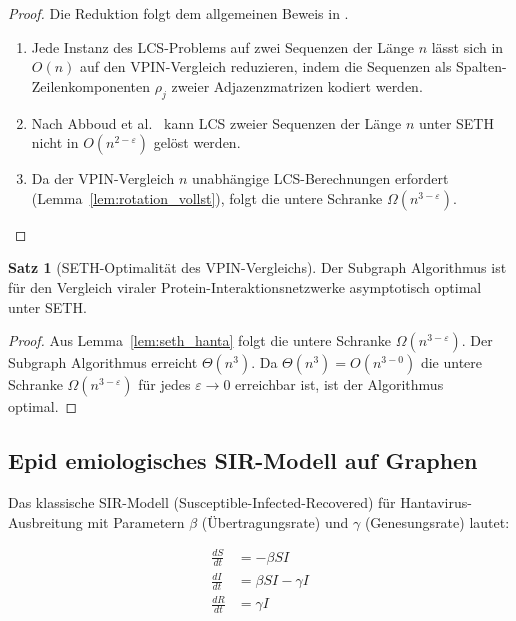 ﻿\documentclass[a4paper,12pt]{article}
\theoremstyle{definition}
\newtheorem{satz}{Satz}
\begin{document}
\begin{proof}
    Die Reduktion folgt dem allgemeinen Beweis in \cite{Epp2026}.
    \begin{enumerate}
        \item Jede Instanz des LCS-Problems auf zwei Sequenzen der L\"ange $n$
              l\"asst sich in $O(n)$ auf den VPIN-Vergleich reduzieren,
              indem die Sequenzen als Spalten-Zeilenkomponenten $\rho_j$
              zweier Adjazenzmatrizen kodiert werden.
        \item Nach Abboud et al.\ \cite{Abboud2015} kann LCS zweier Sequenzen
              der L\"ange $n$ unter SETH nicht in $O(n^{2-\varepsilon})$
              gel\"ost werden.
        \item Da der VPIN-Vergleich $n$ unabh\"angige LCS-Berechnungen erfordert
              (Lemma~\ref{lem:rotation_vollst}), folgt die untere Schranke
              $\Omega(n^{3-\varepsilon})$. \qedhere
    \end{enumerate}
\end{proof}

\begin{satz}[SETH-Optimalit\"at des VPIN-Vergleichs]
    Der Subgraph Algorithmus ist f\"ur den Vergleich viraler
    Protein-Interaktionsnetzwerke asymptotisch optimal unter SETH.
\end{satz}

\begin{proof}
    Aus Lemma~\ref{lem:seth_hanta} folgt die untere Schranke $\Omega(n^{3-\varepsilon})$.
    Der Subgraph Algorithmus erreicht $\Theta(n^3)$. Da $\Theta(n^3) = O(n^{3-0})$
    die untere Schranke $\Omega(n^{3-\varepsilon})$ f\"ur jedes $\varepsilon \to 0$
    erreichbar ist, ist der Algorithmus optimal. \qedhere
\end{proof}

\subsection{Epid emiologisches SIR-Modell auf Graphen}

Das klassische SIR-Modell (Susceptible-Infected-Recovered) f\"ur
Hantavirus-Ausbreitung mit Parametern $\beta$ (\"Ubertragungsrate)
und $\gamma$ (Genesungsrate) lautet:

\begin{align}
    \frac{dS}{dt} &= -\beta S I \\
    \frac{dI}{dt} &= \beta S I - \gamma I \\
    \frac{dR}{dt} &= \gamma I
\end{align}
\end{document}
